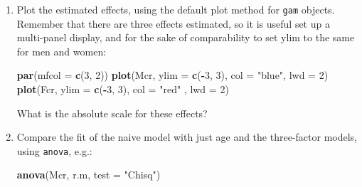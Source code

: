 \documentclass[
]{book}
\newenvironment{Shaded}{\begin{snugshade}}{\end{snugshade}}
\newcommand{\AttributeTok}[1]{\textcolor[rgb]{0.13,0.29,0.53}{#1}}
\newcommand{\DecValTok}[1]{\textcolor[rgb]{0.00,0.00,0.81}{#1}}
\newcommand{\FunctionTok}[1]{\textcolor[rgb]{0.13,0.29,0.53}{\textbf{#1}}}
\newcommand{\NormalTok}[1]{#1}
\newcommand{\SpecialCharTok}[1]{\textcolor[rgb]{0.81,0.36,0.00}{\textbf{#1}}}
\newcommand{\StringTok}[1]{\textcolor[rgb]{0.31,0.60,0.02}{#1}}
\begin{document}
\begin{enumerate}
\begin{Shaded}
\begin{Highlighting}[]
\NormalTok{Parametric coefficients:}
\NormalTok{            Estimate Std. Error z value Pr(\textgreater{}|z|)}
\NormalTok{(Intercept)  {-}3.7848     0.0581   {-}65.2   \textless{}2e{-}16}

\NormalTok{Approximate significance of smooth terms:}
\NormalTok{        edf Ref.df Chi.sq p{-}value}
\NormalTok{s(A)   2.67   3.37  988.5 \textless{} 2e{-}16}
\NormalTok{s(P)   1.90   2.39   20.1 0.00014}
\NormalTok{s(dur) 5.97   6.97   39.0 \textless{} 2e{-}16}

\NormalTok{R{-}sq.(adj) =  0.00417   Deviance explained = 11.1\%}
\NormalTok{UBRE = {-}0.82405  Scale est. = 1         n = 58126}
\end{Highlighting}
\end{Shaded}
\item
  Plot the estimated effects, using the default plot method for
  \texttt{gam} objects. Remember that there are three effects
  estimated, so it is useful set up a multi-panel display, and for
  the sake of comparability to set ylim to the same for men and women:

\begin{Shaded}
\begin{Highlighting}[]
\FunctionTok{par}\NormalTok{(}\AttributeTok{mfcol =} \FunctionTok{c}\NormalTok{(}\DecValTok{3}\NormalTok{, }\DecValTok{2}\NormalTok{))}
\FunctionTok{plot}\NormalTok{(Mcr, }\AttributeTok{ylim =} \FunctionTok{c}\NormalTok{(}\SpecialCharTok{{-}}\DecValTok{3}\NormalTok{, }\DecValTok{3}\NormalTok{), }\AttributeTok{col =} \StringTok{"blue"}\NormalTok{, }\AttributeTok{lwd =} \DecValTok{2}\NormalTok{)}
\FunctionTok{plot}\NormalTok{(Fcr, }\AttributeTok{ylim =} \FunctionTok{c}\NormalTok{(}\SpecialCharTok{{-}}\DecValTok{3}\NormalTok{, }\DecValTok{3}\NormalTok{), }\AttributeTok{col =} \StringTok{"red"}\NormalTok{ , }\AttributeTok{lwd =} \DecValTok{2}\NormalTok{)}
\end{Highlighting}
\end{Shaded}

  What is the absolute scale for these effects?
\item
  Compare the fit of the naive model with just age and the
  three-factor models, using \texttt{anova}, e.g.:

\begin{Shaded}
\begin{Highlighting}[]
\FunctionTok{anova}\NormalTok{(Mcr, r.m, }\AttributeTok{test =} \StringTok{"Chisq"}\NormalTok{)}
\end{Highlighting}
\end{Shaded}


\end{enumerate}
\end{document}
